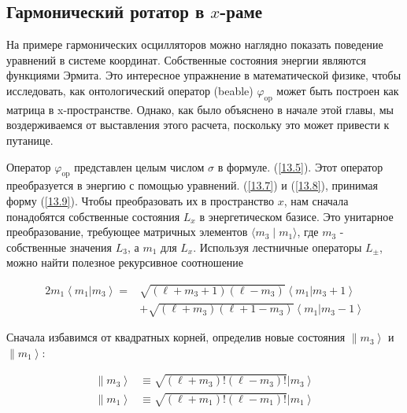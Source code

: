 \documentclass[main.tex]{subfiles}
\begin{document}
\subsection{Гармонический ротатор в $x$-раме }\label{ch13.2}

На примере гармонических осцилляторов можно наглядно показать поведение уравнений в системе координат. Собственные состояния энергии являются функциями Эрмита. Это интересное упражнение в математической физике, чтобы исследовать, как онтологический оператор (beable) $\varphi_{\mathrm{op}}$ может быть построен как матрица в x-пространстве. Однако, как было объяснено в начале этой главы, мы воздерживаемся от выставления этого расчета, поскольку это может привести к путанице.

Оператор $\varphi_{\mathrm{op}}$ представлен целым числом $\sigma$ в формуле. (\ref{13.5}). Этот оператор преобразуется в энергию с помощью уравнений. (\ref{13.7}) и (\ref{13.8}), принимая форму (\ref{13.9}). Чтобы преобразовать их в пространство $x$, нам сначала понадобятся собственные состояния $L_x$ в энергетическом базисе. Это унитарное преобразование, требующее матричных элементов $\langle m_3\mid m_1 \rangle$, где $m_3$ - собственные значения $L_3$, а $m_1$ для $L_x$. Используя лестничные операторы $L_\pm$, можно найти полезное рекурсивное соотношение

\begin{equation}\label{13.12}
	\begin{aligned} 2 m_{1}\left\langle m_{1} | m_{3}\right\rangle=& \sqrt{\left(\ell+m_{3}+1\right)\left(\ell-m_{3}\right)}\left\langle m_{1} | m_{3}+1\right\rangle \\ &+\sqrt{\left(\ell+m_{3}\right)\left(\ell+1-m_{3}\right)}\left\langle m_{1} | m_{3}-1\right\rangle \end{aligned}
\end{equation}
 
Сначала избавимся от квадратных корней, определив новые состояния $\left.\| m_{3}\right\rangle$ и $\left.\| m_{1}\right\rangle$:

\begin{equation}\label{13.13}
	\begin{aligned}\left.\| m_{3}\right\rangle & \equiv \sqrt{\left(\ell+m_{3}\right) !\left(\ell-m_{3}\right) !}\left|m_{3}\right\rangle \\\left.\| m_{1}\right\rangle & \equiv \sqrt{\left(\ell+m_{1}\right) !\left(\ell-m_{1}\right) !}\left|m_{1}\right\rangle \end{aligned}
\end{equation}
\end{document}
